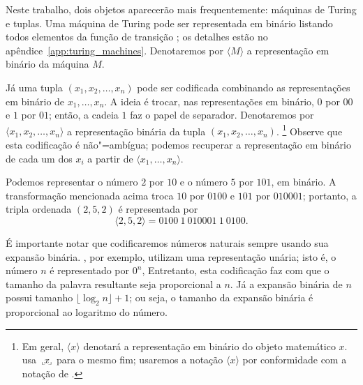 Neste trabalho,
dois objetos aparecerão mais frequentemente:
máquinas de Turing e tuplas.
Uma máquina de Turing pode ser representada em binário
listando todos elementos da função de transição
\cite[p.~182]{HopcroftUllman1979};
os detalhes estão no apêndice~\ref{app:turing_machines}.
Denotaremos por $\langle M \rangle$ a representação em binário da máquina $M$.

Já uma tupla $(x_1, x_2, \dots, x_n)$ pode ser codificada
combinando as representações em binário de $x_1, \dots, x_n$.
A ideia é trocar, nas representações em binário,
$0$ por $00$ e $1$ por $01$;
então, a cadeia $1$ faz o papel de separador.
Denotaremos por $\langle x_1, x_2, \dots, x_n \rangle$
a representação binária da tupla $(x_1, x_2, \dots, x_n)$.%
\footnote{
    Em geral, $\langle x \rangle$ denotará a representação em binário
    do objeto matemático $x$.
     usa
    $\sideset{_\llcorner}{_\lrcorner}{\mathop{\makebox[0.5ex]{$x$}}}$
    para o mesmo fim;
    usaremos a notação $\langle x \rangle$
    por conformidade com a notação de .
}
Observe que esta codificação é não"=ambígua;
podemos recuperar a representação em binário de cada um dos $x_i$
a partir de $\langle x_1, \dots, x_n \rangle$.

\begin{example}
    Podemos representar o número $2$ por $10$ e o número $5$ por $101$,
    em binário.
    A transformação mencionada acima troca $10$ por $0100$
    e $101$ por $010001$;
    portanto, a tripla ordenada $(2, 5, 2)$ é representada por
    \begin{equation*}
        \langle 2, 5, 2 \rangle = 0100\ 1\ 010001\ 1\ 0100.
    \end{equation*}
\end{example}

É importante notar que codificaremos números naturais
sempre usando sua expansão binária.
,
por exemplo,
utilizam uma representação unária;
isto é, o número $n$ é representado por $0^n$,
Entretanto,
esta codificação faz com que o tamanho da palavra resultante
seja proporcional a $n$.
Já a expansão binária de $n$ possui tamanho $\lfloor \log_2 n \rfloor + 1$;
ou seja, o tamanho da expansão binária é proporcional ao logaritmo do número.

